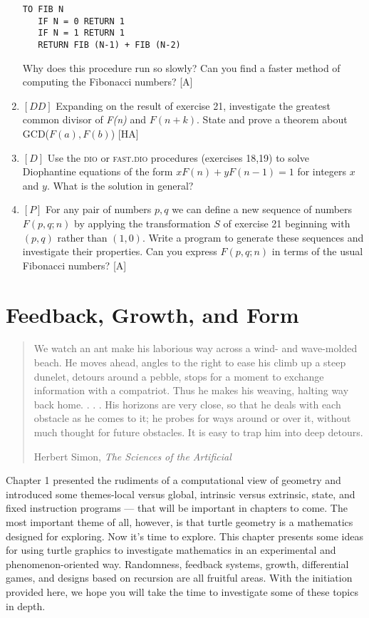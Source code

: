 \documentclass{book}
\begin{document}
\begin{enumerate}
\begin{verbatim}
TO FIB N
   IF N = 0 RETURN 1
   IF N = 1 RETURN 1
   RETURN FIB (N-1) + FIB (N-2)
\end{verbatim}
Why does this procedure run so slowly? Can you find a faster method
of computing the Fibonacci numbers? [A]
\item $[DD]$ Expanding on the result of exercise 21, investigate the greatest
common divisor of {\em F(n)} and $F(n + k)$. State and prove a theorem about
GCD($F(a), F(b)$) [HA]
\item $[D]$ Use the \textsc{dio} or \textsc{fast.dio} procedures (exercises 18,19) to solve
Diophantine equations of the form $xF(n) + yF(n - 1) = 1$ for integers
$x$ and $y$. What is the solution in general?  
\item $[P]$ For any pair of numbers $p,q$ we can define a new sequence of
numbers $F(p, q; n)$ by applying the transformation $S$ of exercise 21 beginning with $(p, q)$ rather than $(1,0)$. Write a program to generate these
sequences and investigate their properties. Can you express $F(p, q; n)$ in
terms of the usual Fibonacci numbers? [A]
\end{enumerate}

\chapter{Feedback, Growth, and Form}
\begin{quote}We watch an ant make his laborious way across a
wind- and wave-molded beach. He moves ahead,
angles to the right to ease his climb up a steep
dunelet, detours around a pebble, stops for a moment to exchange information with a compatriot.
Thus he makes his weaving, halting way back home.
. . . His horizons are very close, so that he deals with
each obstacle as he comes to it; he probes for ways
around or over it, without much thought for future
obstacles. It is easy to trap him into deep detours.

Herbert Simon, {\em The Sciences of the Artificial}\end{quote}

Chapter 1 presented the rudiments of a computational view of geometry
and introduced some themes-local versus global, intrinsic versus extrinsic, state, and fixed instruction programs --- that will be important in
chapters to come. The most important theme of all, however, is that
turtle geometry is a mathematics designed for exploring. Now it's time
to explore. This chapter presents some ideas for using turtle graphics to
investigate mathematics in an experimental and phenomenon-oriented
way. Randomness, feedback systems, growth, differential games, and
designs based on recursion are all fruitful areas. With the initiation
provided here, we hope you will take the time to investigate some of
these topics in depth.
\end{document}
